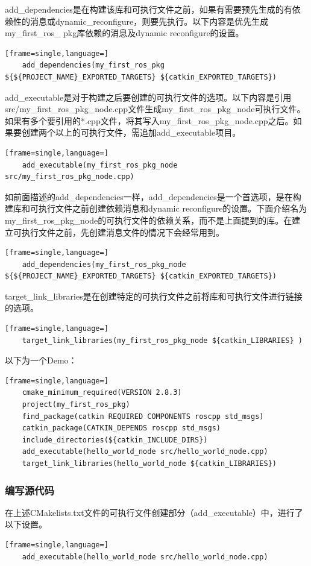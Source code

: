 \documentclass[geye,green,kindle,cn]{elegantnote}
\begin{document}
add\_dependencies是在构建该库和可执行文件之前，如果有需要预先生成的有依赖性的消息或dynamic\_reconfigure，则要先执行。以下内容是优先生成my\_first\_ros\_ pkg库依赖的消息及dynamic reconfigure的设置。
\begin{lstlisting}[frame=single,language=]
    add_dependencies(my_first_ros_pkg ${${PROJECT_NAME}_EXPORTED_TARGETS} ${catkin_EXPORTED_TARGETS})
\end{lstlisting}

add\_executable是对于构建之后要创建的可执行文件的选项。以下内容是引用src/my\_first\_ros\_pkg\_node.cpp文件生成my\_first\_ros\_pkg\_node可执行文件。如果有多个要引用的*.cpp文件，将其写入my\_first\_ros\_pkg\_node.cpp之后。如果要创建两个以上的可执行文件，需追加add\_executable项目。
\begin{lstlisting}[frame=single,language=]
    add_executable(my_first_ros_pkg_node src/my_first_ros_pkg_node.cpp)
\end{lstlisting}

如前面描述的add\_dependencies一样，add\_dependencies是一个首选项，是在构建库和可执行文件之前创建依赖消息和dynamic reconfigure的设置。下面介绍名为my\_first\_ros\_pkg\_node的可执行文件的依赖关系，而不是上面提到的库。在建立可执行文件之前，先创建消息文件的情况下会经常用到。
\begin{lstlisting}[frame=single,language=]
    add_dependencies(my_first_ros_pkg_node ${${PROJECT_NAME}_EXPORTED_TARGETS} ${catkin_EXPORTED_TARGETS})
\end{lstlisting}

target\_link\_libraries是在创建特定的可执行文件之前将库和可执行文件进行链接的选项。
\begin{lstlisting}[frame=single,language=]
    target_link_libraries(my_first_ros_pkg_node ${catkin_LIBRARIES} )
\end{lstlisting}

以下为一个Demo：
\begin{lstlisting}[frame=single,language=]
    cmake_minimum_required(VERSION 2.8.3)
    project(my_first_ros_pkg)
    find_package(catkin REQUIRED COMPONENTS roscpp std_msgs)
    catkin_package(CATKIN_DEPENDS roscpp std_msgs)
    include_directories(${catkin_INCLUDE_DIRS})
    add_executable(hello_world_node src/hello_world_node.cpp)
    target_link_libraries(hello_world_node ${catkin_LIBRARIES})
\end{lstlisting}
\subsubsection{编写源代码}
在上述CMakelists.txt文件的可执行文件创建部分（add\_executable）中，进行了以下设置。
\begin{lstlisting}[frame=single,language=]
    add_executable(hello_world_node src/hello_world_node.cpp)
\end{lstlisting}
\end{document}
